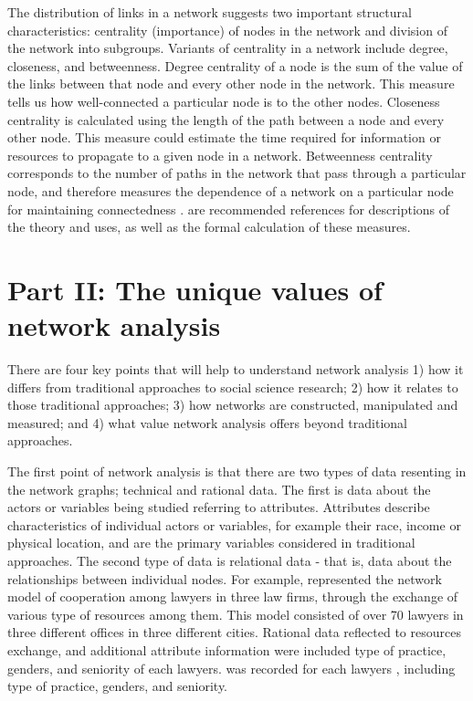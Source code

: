 The distribution of links in a network suggests two important structural characteristics: centrality (importance) of nodes in the network and division of the network into subgroups. Variants of centrality in a network include degree, closeness, and betweenness. Degree centrality of a node is the sum of the value of the links between that node and every other node in the network. This measure tells us how well-connected a particular node is to the other nodes. Closeness centrality is calculated using the length of the path between a node and every other node. This measure could estimate the time required for information or resources to propagate to a given node in a network. Betweenness centrality corresponds to the number of paths in the network that pass through a particular node, and therefore measures the dependence of a network on a particular node for maintaining connectedness .  are recommended references for descriptions of the theory and uses, as well as the formal calculation of these measures.


\section*{Part II: The unique values of network analysis}

There are four key points that will help to understand network analysis 1) how it differs from traditional approaches to social science research; 2) how it relates to those traditional approaches; 3) how networks are constructed, manipulated and measured; and 4) what value network analysis offers beyond traditional approaches.

The first point of network analysis is that there are two types of data resenting in the network graphs; technical and rational data. The first is data about the actors or variables being studied referring to attributes. Attributes describe characteristics of individual actors or variables, for example their race, income or physical location, and are the primary variables considered in traditional approaches. The second type of data is relational data - that is, data about the relationships between individual nodes. For example,  represented the network model of cooperation among lawyers in three law firms, through the exchange of various type of resources among them. This model consisted of over 70 lawyers in three different offices in three different cities. Rational data reflected to resources exchange, and additional attribute information were included type of practice, genders, and seniority of each lawyers.
was recorded for each lawyers , including type of practice, genders, and seniority.

